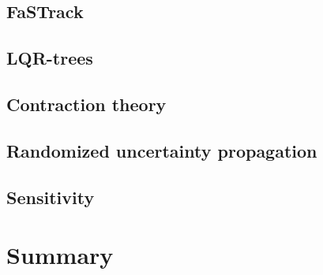 \subsection{FaSTrack}

\subsection{LQR-trees}

\subsection{Contraction theory}

\subsection{Randomized uncertainty propagation}

\subsection{Sensitivity}

\section{Summary}